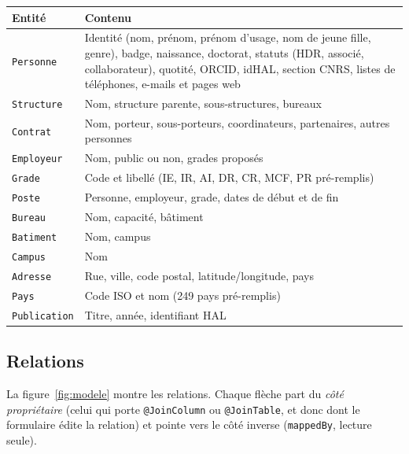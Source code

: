 \documentclass[a4paper,11pt]{article}
\newcommand{\code}[1]{\texttt{#1}}
\begin{document}
\begin{center}
\begin{tabularx}{\linewidth}{@{}lX@{}}
\toprule
\textbf{Entité} & \textbf{Contenu} \\
\midrule
\code{Personne} & Identité (nom, prénom, prénom d'usage, nom de jeune fille,
  genre), badge, naissance, doctorat, statuts (HDR, associé, collaborateur),
  quotité, ORCID, idHAL, section CNRS, listes de téléphones, e-mails et pages
  web \\
\code{Structure} & Nom, structure parente, sous-structures, bureaux \\
\code{Contrat} & Nom, porteur, sous-porteurs, coordinateurs, partenaires,
  autres personnes \\
\code{Employeur} & Nom, public ou non, grades proposés \\
\code{Grade} & Code et libellé (IE, IR, AI, DR, CR, MCF, PR pré-remplis) \\
\code{Poste} & Personne, employeur, grade, dates de début et de fin \\
\code{Bureau} & Nom, capacité, bâtiment \\
\code{Batiment} & Nom, campus \\
\code{Campus} & Nom \\
\code{Adresse} & Rue, ville, code postal, latitude/longitude, pays \\
\code{Pays} & Code ISO et nom (249 pays pré-remplis) \\
\code{Publication} & Titre, année, identifiant HAL \\
\bottomrule
\end{tabularx}
\end{center}

\subsection{Relations}

La figure~\ref{fig:modele} montre les relations. Chaque flèche part du
\emph{côté propriétaire} (celui qui porte \code{@JoinColumn} ou
\code{@JoinTable}, et donc dont le formulaire édite la relation) et pointe
vers le côté inverse (\code{mappedBy}, lecture seule).
\end{document}

